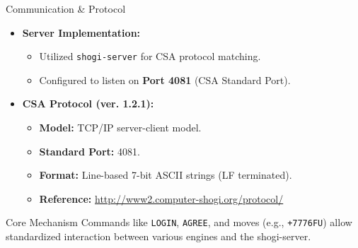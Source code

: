 \documentclass[aspectratio=169]{beamer}
\begin{document}
\begin{frame}{Communication \& Protocol}
    \begin{itemize}
        \item \textbf{Server Implementation:} 
            \begin{itemize}
                \item Utilized \texttt{shogi-server} for CSA protocol matching.
                \item Configured to listen on \textbf{Port 4081} (CSA Standard Port).
            \end{itemize}
        
        \item \textbf{CSA Protocol (ver. 1.2.1):}
            \begin{itemize}
                \item \textbf{Model:} TCP/IP server-client model.
                \item \textbf{Standard Port:} 4081.
                \item \textbf{Format:} Line-based 7-bit ASCII strings (LF terminated).
                \item \textbf{Reference:} \url{http://www2.computer-shogi.org/protocol/}
            \end{itemize}
    \end{itemize}

    \begin{block}{Core Mechanism}
        Commands like \texttt{LOGIN}, \texttt{AGREE}, and moves (e.g., \texttt{+7776FU}) allow standardized interaction between various engines and the shogi-server.
    \end{block}
\end{frame}
\end{document}
